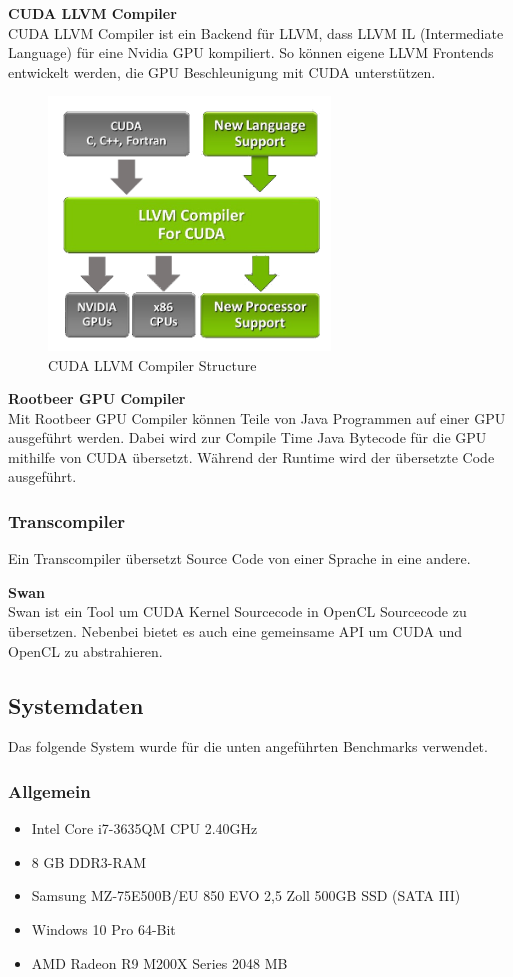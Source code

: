 \newpage

\textbf{CUDA LLVM Compiler}\\
CUDA LLVM Compiler ist ein Backend für LLVM, dass LLVM IL (Intermediate Language) für eine Nvidia GPU kompiliert. So können eigene LLVM Frontends entwickelt werden, die GPU Beschleunigung mit CUDA unterstützen.

\begin{figure}[!h]
	\begin{center}
		\includegraphics[width=7.5cm]{images/LLVM_Compiler_structure.png}
		\caption{CUDA LLVM Compiler Structure\cite{cudallvm}}
	\end{center}
\end{figure}

\textbf{Rootbeer GPU Compiler}\\
Mit Rootbeer GPU Compiler können Teile von Java Programmen auf einer GPU ausgeführt werden. Dabei wird zur Compile Time Java Bytecode für die GPU mithilfe von CUDA übersetzt. Während der Runtime wird der übersetzte Code ausgeführt.\cite{rootbeer1}

\subsubsection{Transcompiler}
Ein Transcompiler übersetzt Source Code von einer Sprache in eine andere.

\textbf{Swan}\\
Swan ist ein Tool um CUDA Kernel Sourcecode in OpenCL Sourcecode zu übersetzen. Nebenbei bietet es auch eine gemeinsame API um CUDA und OpenCL zu abstrahieren.\cite{swan}
\newpage
\subsection{Systemdaten}
Das folgende System wurde für die unten angeführten Benchmarks verwendet.
\subsubsection{Allgemein}
\begin{itemize}
\item Intel Core i7-3635QM CPU 2.40GHz
\item 8 GB DDR3-RAM
\item Samsung MZ-75E500B/EU 850 EVO 2,5 Zoll 500GB SSD (SATA III)
\item Windows 10 Pro 64-Bit
\item AMD Radeon R9 M200X Series 2048 MB
\end{itemize}
